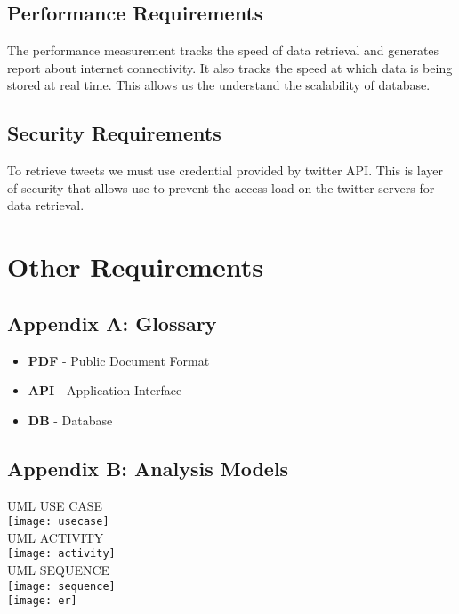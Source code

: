 \documentclass{scrreprt}
\begin{document}
\section{Performance Requirements}
The performance measurement tracks the speed of data retrieval and generates report about internet connectivity. 
It also tracks the speed at which data is being stored at real time. This allows us the understand the scalability of database.

\section{Security Requirements}
To retrieve tweets we must use credential provided by twitter API. This is layer of security that allows use to prevent the access load on the 
twitter servers for data retrieval.

\chapter{Other Requirements}

\section{Appendix A: Glossary}
\begin{itemize}
	\item \textbf{PDF} - Public Document Format
	\item \textbf{API} - Application Interface
	\item \textbf{DB} - Database
\end{itemize}

\section{Appendix B: Analysis Models}
\LARGE{UML USE CASE}\\
\texttt{[image: usecase]}\\

\LARGE{UML ACTIVITY}\\
\texttt{[image: activity]}\\

\LARGE{UML SEQUENCE}\\
\texttt{[image: sequence]}\\

\texttt{[image: er]}\\
\end{document}
